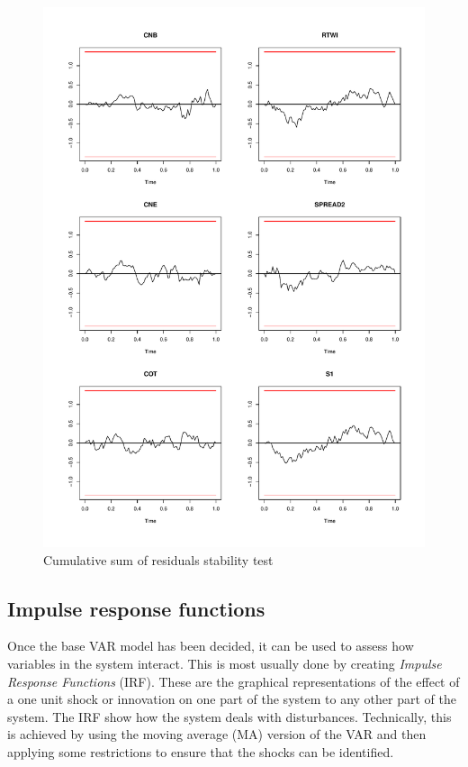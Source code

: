 \documentclass[12pt, a4paper, oneside]{article}\usepackage[]{graphicx}\usepackage[]{color}
\begin{document}
\begin{figure}[h!]
\graphicspath{{Pictures/C2/}}
\centering
\caption{Cumulative sum of residuals stability test}
\label{figref:cusum}
\includegraphics[scale=0.5] {stab}
\end{figure} 


 \subsection{Impulse response functions}\label{secref:IRF}
Once the base VAR model has been decided, it can be used to assess how variables in the system interact.  This is most usually done by creating \emph{Impulse Response Functions} (IRF).  These are the graphical representations of the effect of a one unit shock or innovation on one part of the system to any other part of the system.  The IRF show how the system deals with disturbances.  Technically, this is achieved by using the moving average (MA) version of the VAR and then applying some restrictions to ensure that the shocks can be identified.  
\end{document}
